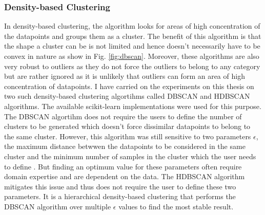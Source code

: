 \subsubsection{Density-based Clustering}
 In density-based clustering, the algorithm looks for areas of high concentration of the datapoints and groups them as a cluster. The benefit of this algorithm is that the shape a cluster can be is not limited and hence doesn't necessarily have to be convex in nature as show in Fig. \ref*{fig:dbscan}.
Moreover, these algorithms are also very robust to outliers as they do not force the outliers to belong to any category but are rather ignored as it is unlikely that outliers can form an area of high concentration of datapoints. I have carried on the experiments on this thesis on two such density-based clustering algortihms called \ac{DBSCAN}\cite*{dbscan} and \ac{HDBSCAN} algorithms\cite*{hdbscan}. The available scikit-learn implementations were used for this purpose\cite*{scikit-learn}. The \ac{DBSCAN}\cite*{dbscan} algortihm  does not require the users to define the number of clusters to be generated which doesn't force dissimilar datapoints to belong to the same cluster. However, this algorithm was still sensitive to two parameters $\epsilon$, the maximum distance betwwen the datapoints to be considered in the same cluster and the minimum number of samples in the cluster which the user needs to define \cite*{scikit-learn}. But finding an optimum value for these parameters often require domain expertise and are dependent on the data. The \ac{HDBSCAN}\cite*{hdbscan} algorithm mitigates this issue and thus does not require the user to define these two parameters. It is a hierarchical density-based clustering that performs the \ac{DBSCAN} algorithm over multiple $\epsilon$ values to find the most stable result. 

